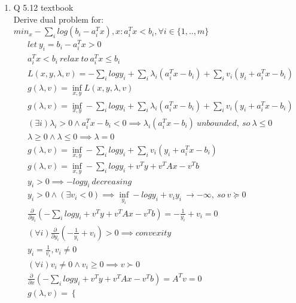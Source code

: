 \documentclass[12pt,letter]{article}
\begin{document}


\begin{enumerate}
\item Q 5.12 textbook\\
  Derive dual problem for: $min_x - \sum_i log(b_i-a_i^Tx), x: a_i^Tx < b_i, \forall i \in \{1,..,m\}$
  \begin{align*}
    &let\ y_i = b_i-a_i^Tx > 0\\
    &a_i^Tx < b_i\ relax\ to\ a_i^Tx \leq b_i\\
    &L(x,y,\lambda,v)=-\sum_i log y_i + \sum_i \lambda_i(a_i^Tx-b_i) + \sum_i v_i(y_i+a_i^Tx-b_i)\\
    &g(\lambda,v)=\inf_{x,y} L(x,y,\lambda,v)\\
    &g(\lambda,v)=\inf_{x,y}-\sum_i log y_i + \sum_i \lambda_i(a_i^Tx-b_i) + \sum_i v_i(y_i+a_i^Tx-b_i)\\
    &(\exists i)\lambda_i > 0 \wedge a_i^Tx - b_i < 0 \implies \lambda_i(a_i^Tx-b_i)\ unbounded,\ so\ \lambda \leq 0\\
    &\lambda \geq 0 \wedge \lambda \leq 0 \implies \lambda = 0\\
    &g(\lambda,v)=\inf_{x,y}-\sum_i log y_i + \sum_i v_i(y_i+a_i^Tx-b_i)\\
    &g(\lambda,v)=\inf_{x,y}-\sum_i log y_i + v^Ty + v^TAx - v^Tb\\
    &y_i > 0 \implies -log y_i\ decreasing\\
    &y_i > 0 \wedge (\exists v_i < 0) \implies \inf_{y_i} -log y_i + v_i y_i\ \to -\infty,\ so\ v \succeq 0\\
    &\frac{\partial}{\partial y_i}(-\sum_i log y_i + v^Ty + v^TAx - v^Tb)=-\frac{1}{y_i} + v_i=0\\
    &(\forall i) \frac{\partial}{\partial y_i}(-\frac{1}{y_i} + v_i)>0 \implies convexity\\
    &y_i = \frac{1}{v_i}, v_i \neq 0\\
    &(\forall i) v_i \neq 0 \wedge v_i \geq 0 \implies v \succ 0\\
    &\frac{\partial}{\partial x}(-\sum_i log y_i + v^Ty + v^TAx - v^Tb)=A^Tv=0\\
    &g(\lambda,v)=
      \begin{cases}

\end{cases}
\end{align*}
\end{enumerate}
\end{document}
